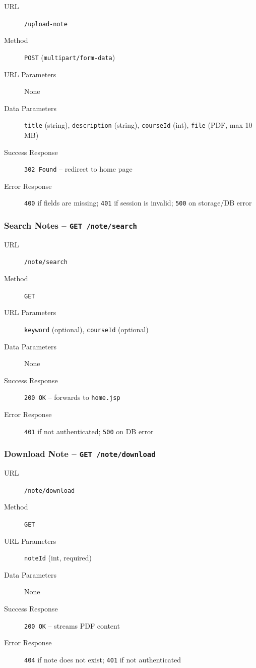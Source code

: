 \documentclass[12pt, a4paper]{article}
\begin{document}
    \begin{description}
        \item[URL] \texttt{/upload-note}
        \item[Method] \texttt{POST} (\texttt{multipart/form-data})
        \item[URL Parameters] None
        \item[Data Parameters] \texttt{title} (string), \texttt{description} (string),
        \texttt{courseId} (int), \texttt{file} (PDF, max 10\,MB)
        \item[Success Response] \texttt{302 Found} -- redirect to home page
        \item[Error Response] \texttt{400} if fields are missing;
        \texttt{401} if session is invalid; \texttt{500} on storage/DB error
    \end{description}

    \subsubsection{Search Notes -- \texttt{GET /note/search}}

    \begin{description}
        \item[URL] \texttt{/note/search}
        \item[Method] \texttt{GET}
        \item[URL Parameters] \texttt{keyword} (optional), \texttt{courseId} (optional)
        \item[Data Parameters] None
        \item[Success Response] \texttt{200 OK} -- forwards to \texttt{home.jsp}
        \item[Error Response] \texttt{401} if not authenticated; \texttt{500} on DB error
    \end{description}

    \subsubsection{Download Note -- \texttt{GET /note/download}}

    \begin{description}
        \item[URL] \texttt{/note/download}
        \item[Method] \texttt{GET}
        \item[URL Parameters] \texttt{noteId} (int, required)
        \item[Data Parameters] None
        \item[Success Response] \texttt{200 OK} -- streams PDF content
        \item[Error Response] \texttt{404} if note does not exist;
        \texttt{401} if not authenticated
    \end{description}
\end{document}
